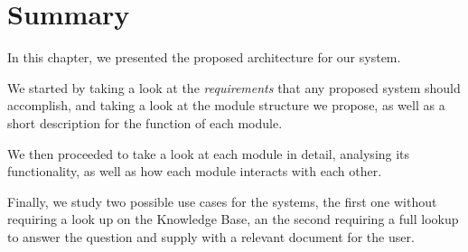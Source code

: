 % 

\section{Summary}

In this chapter, we presented the proposed architecture for our system.

We started by taking a look at the \emph{requirements} that any proposed system should accomplish, and taking a look at the module structure we propose, as well as a short description for the function of each module.

We then proceeded to take a look at each module in detail, analysing its functionality, as well as how each module interacts with each other.

Finally, we study two possible use cases for the systems, the first one without requiring a look up on the Knowledge Base, an the second requiring a full lookup to answer the question and supply with a relevant document for the user.